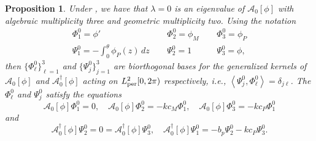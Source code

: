 \documentclass[11pt,leqno]{article}
\numberwithin{equation}{section}
\newcommand\LA{\left\langle}
\newcommand\RA{\right\rangle}
\newtheorem{proposition}[theorem]{Proposition}
\theoremstyle{definition}
\begin{document}
\begin{proposition}\label{P:gkerper}
Under , we have that $\lambda = 0$ is an eigenvalue of $\mathcal{A}_0[\phi]$ with algebraic multiplicity three and geometric multiplicity two.  Using the notation
\[
\begin{array}{ccccc}
    \Phi_1^0 = \phi' & ~~ & \Phi_2^0 = \phi_M & ~~ & \Phi_3^0 = \phi_P \\
    \Psi_1^0 = -\int_0^\theta \phi_P(z)\,dz & ~~ & \Psi_2^0 = 1 & ~~ & \Psi_3^0 = \phi,
\end{array}
\]
then $\{\Phi_\ell^0\}_{\ell=1}^3$ and $\{\Psi_j^0\}_{j=1}^3$ are biorthogonal bases for the generalized kernels of $\mathcal{A}_0[\phi]$ and $\mathcal{A}_0^\dagger[\phi]$ acting on $ L^{2}_{\rm per}[0,2\pi) $ respectively, i.e., $\LA \Psi_j^0, \Phi_\ell^0\RA = \delta_{j\ell}$. The $\Phi_\ell^0$ and $\Psi_j^0$ satisfy the equations
\[
\mathcal{A}_0[\phi]\Phi_1^0 = 0, \quad \mathcal{A}_0[\phi]\Phi_2^0 = -kc_M\Phi_1^0, \quad \mathcal{A}_0[\phi]\Phi_3^0 = -kc_P\Phi_1^0
\]
and
\[
\mathcal{A}_0^\dagger[\phi]\Psi_2^0 = 0 = \mathcal{A}_0^\dagger[\phi]\Psi_3^0, \quad \mathcal{A}_0^\dagger[\phi]\Psi_1^0 = -b_p\Psi_2^0 - kc_P\Psi_3^0.
\]
\end{proposition}
\end{document}
